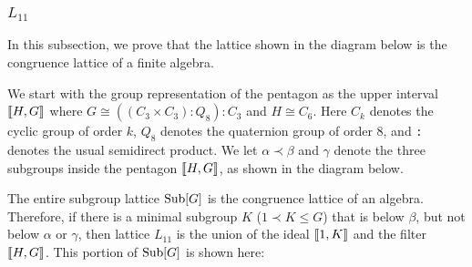 \subsubsection{$L_{11}$}
\label{sec:l11}
In this subsection, we prove that the lattice shown in the diagram below is the congruence lattice of a finite algebra.

\begin{center}
  \begin{tikzpicture}[scale=1]
    
  \end{tikzpicture}
\end{center}


We start with the group representation of the pentagon as the upper
interval $\lb H, G\rb$ 
where $G \cong ((C_3 \times C_3) : Q_8) : C_3$ and 
$H \cong C_6$.  Here $C_k$ denotes the cyclic group of order $k$, $Q_8$ denotes the
quaternion group of order 8, and {\tt :} denotes the usual semidirect product.
We let $\alpha \prec \beta$ and $\gamma$ denote the three
subgroups inside the pentagon $\lb H, G \rb$, as shown in the diagram below.  

The entire subgroup lattice
$\Sub[G]$ is the congruence lattice of an algebra. Therefore, if there is a minimal
subgroup $K$ ($1 \prec K \leq G$) that is below $\beta$, but not below 
$\alpha$ or $\gamma$, then lattice $L_{11}$ is the 
union of the ideal $\lb 1, K\rb$ and the filter $\lb H, G\rb$.
This portion of $\Sub[G]$ is shown here:


